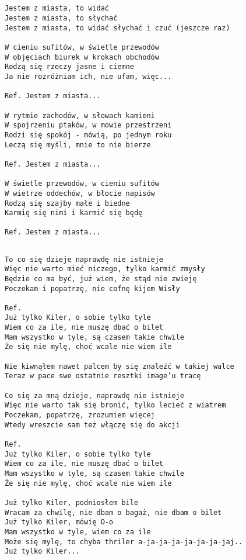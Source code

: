 \documentclass[12pt]{article}
\begin{document}
\subsection*{}
\begin{verbatim}
Jestem z miasta, to widać
Jestem z miasta, to słychać
Jestem z miasta, to widać słychać i czuć (jeszcze raz)

W cieniu sufitów, w świetle przewodów
W objęciach biurek w krokach obchodów
Rodzą się rzeczy jasne i ciemne
Ja nie rozróżniam ich, nie ufam, więc...

Ref. Jestem z miasta...

W rytmie zachodów, w słowach kamieni
W spojrzeniu ptaków, w mowie przestrzeni
Rodzi się spokój - mówią, po jednym roku
Leczą się myśli, mnie to nie bierze

Ref. Jestem z miasta...

W świetle przewodów, w cieniu sufitów
W wietrze oddechów, w błocie napisów
Rodzą się szajby małe i biedne
Karmię się nimi i karmić się będę

Ref. Jestem z miasta...
\end{verbatim}
\clearpage

\subsection*{}
\begin{verbatim}
To co się dzieje naprawdę nie istnieje
Więc nie warto mieć niczego, tylko karmić zmysły
Będzie co ma być, już wiem, że stąd nie zwieję
Poczekam i popatrzę, nie cofnę kijem Wisły

Ref.
Już tylko Kiler, o sobie tylko tyle
Wiem co za ile, nie muszę dbać o bilet
Mam wszystko w tyle, są czasem takie chwile
Że się nie mylę, choć wcale nie wiem ile

Nie kiwnąłem nawet palcem by się znaleźć w takiej walce
Teraz w pace swe ostatnie resztki image’u tracę

Co się za mną dzieje, naprawdę nie istnieje
Więc nie warto tak się bronić, tylko lecieć z wiatrem
Poczekam, popatrzę, zrozumiem więcej
Wtedy wreszcie sam też włączę się do akcji

Ref.
Już tylko Kiler, o sobie tylko tyle
Wiem co za ile, nie muszę dbać o bilet
Mam wszystko w tyle, są czasem takie chwile
Że się nie mylę, choć wcale nie wiem ile

Już tylko Kiler, podniosłem bile
Wracam za chwilę, nie dbam o bagaż, nie dbam o bilet
Już tylko Kiler, mówię O-o
Mam wszystko w tyle, wiem co za ile
Może się mylę, to chyba thriler a-ja-ja-ja-ja-ja-ja-jaj..
Już tylko Kiler...
\end{verbatim}
\clearpage
\end{document}
